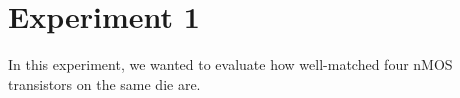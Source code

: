 \section*{Experiment 1}
In this experiment, we wanted to evaluate how well-matched four nMOS transistors on the same die are.